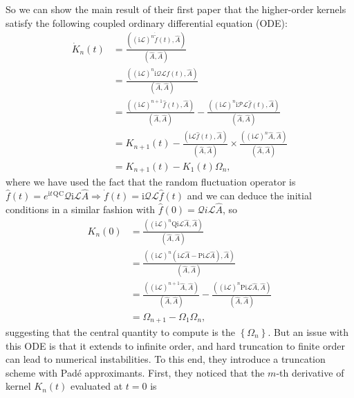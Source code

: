 So we can show the main result of their first paper that the higher-order kernels satisfy the following coupled ordinary differential equation (ODE):
\begin{align}
\dot{K}_n(t) & =\frac{\left((\mathrm{i} \mathcal{L})^n \dot{\tilde{f}}(t), \hat{A}\right)}{(\hat{A}, \hat{A})} \\
& =\frac{\left((\mathrm{i} \mathcal{L})^n \mathrm{i} \mathcal{Q} \mathcal{L} \hat{f}(t), \hat{A}\right)}{(\hat{A}, \hat{A})} \\
& =\frac{\left((\mathrm{i} \mathcal{L})^{n+1} \hat{f}(t), \hat{A}\right)}{(\hat{A}, \hat{A})}-\frac{\left((\mathrm{i} \mathcal{L})^n \mathrm{i} \mathcal{P} \mathcal{L} \hat{f}(t), \hat{A}\right)}{(\hat{A}, \hat{A})} \\
& =K_{n+1}(t)-\frac{(\mathrm{i} \mathcal{L} \hat{f}(t), \hat{A})}{(\hat{A}, \hat{A})} \times \frac{\left((\mathrm{i} \mathcal{L})^n \hat{A}, \hat{A}\right)}{(\hat{A}, \hat{A})} \\
& =K_{n+1}(t)-K_1(t) \Omega_n,
\end{align}
where we have used the fact that the random fluctuation operator is $\hat{f}(t)=e^{\mathrm{i} t}{ }^{\mathrm{Q}}{ }^{\mathrm{C}} \mathcal{Q} \mathrm{i} \mathcal{L} \hat{A} \Longrightarrow \dot{f}(t)=\mathrm{i} \mathcal{Q} \mathcal{L} \hat{f}(t)$ and we can deduce the initial conditions in a similar fashion with $\hat{f}(0)=\mathcal{Q} i \mathcal{L} \hat{A}$, so
\begin{align}
K_n(0) & =\frac{\left((\mathrm{i} \mathcal{L})^n \mathrm{Qi} \mathcal{L} \hat{A}, \hat{A}\right)}{(\hat{A}, \hat{A})} \\
& =\frac{\left((\mathrm{i} \mathcal{L})^n(\mathrm{i} \mathcal{L} \hat{A}-\mathrm{P} \mathrm{i} \mathcal{L} \hat{A}), \hat{A}\right)}{(\hat{A}, \hat{A})} \\
& =\frac{\left((\mathrm{i} \mathcal{L})^{n+1} \hat{A}, \hat{A}\right)}{(\hat{A}, \hat{A})}-\frac{\left((\mathrm{i} \mathcal{L})^n \mathrm{P} \mathrm{i} \mathcal{L} \hat{A}, \hat{A}\right)}{(\hat{A}, \hat{A})} \\
& =\Omega_{n+1}-\Omega_1 \Omega_n,
\end{align}
suggesting that the central quantity to compute is the $\left\{\Omega_n\right\}$. But an issue with this ODE is that it extends to infinite order, and hard truncation to finite order can lead to numerical instabilities. To this end, they introduce a truncation scheme with Padé approximants. First, they noticed that the $m$-th derivative of kernel $K_n(t)$ evaluated at $t=0$ is
